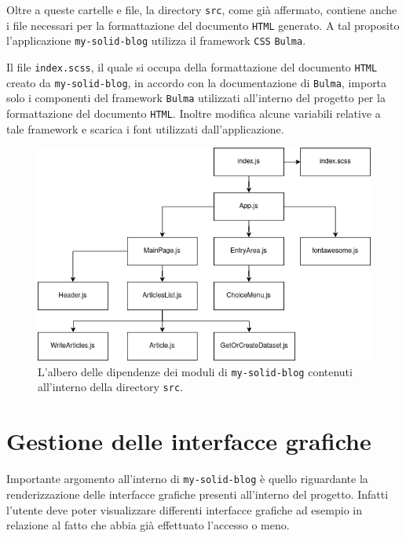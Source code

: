 \bigskip

Oltre a queste cartelle e file, la directory {\tt src}, come già affermato, contiene anche i file necessari per la formattazione del documento {\tt HTML} generato. A tal proposito l'applicazione {\tt my-solid-blog} utilizza il framework {\tt CSS} {\tt Bulma}. 

\medskip

Il file {\tt index.scss}, il quale si occupa della formattazione del documento {\tt HTML} creato da {\tt my-solid-blog}, in accordo con la documentazione di {\tt Bulma}, importa solo i componenti del framework {\tt Bulma} utilizzati all'interno del progetto per la formattazione del documento {\tt HTML}. Inoltre modifica alcune variabili relative a tale framework e scarica i font utilizzati dall'applicazione.

\begin{figure}[ht]
	\centering
	\includegraphics[width=0.87
	\textwidth,  keepaspectratio]{fig/Dependencies}
	\caption{L'albero delle dipendenze dei moduli di {\tt my-solid-blog} contenuti all'interno della directory {\tt src}.}
	\label{fig:bernersLee}
\end{figure}

\bigskip

\section{Gestione delle interfacce grafiche}

\medskip

Importante argomento all'interno di {\tt my-solid-blog} è quello riguardante la renderizzazione delle interfacce grafiche presenti all'interno del progetto. Infatti l'utente deve poter visualizzare differenti interfacce grafiche ad esempio in relazione al fatto che abbia già effettuato l'accesso o meno. 

